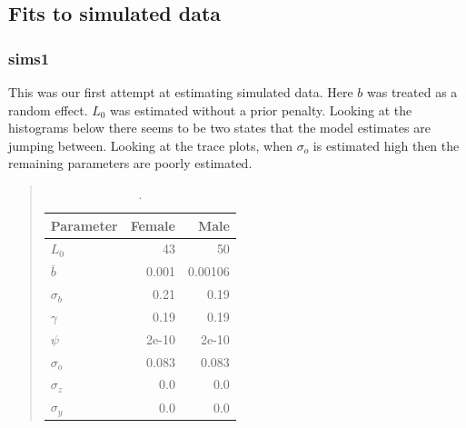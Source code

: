 \documentclass[11pt, a4paper]{article}
\begin{document}
\newpage\clearpage
\subsection{Fits to simulated data}

\subsubsection{sims1}
This was our first attempt at estimating simulated data.  Here $b$ was treated
as a random effect.  $L_0$ was estimated without a prior penalty.  Looking at
the histograms below there seems to be two states that the model estimates are
jumping between.  Looking at the trace plots, when $\sigma_o$ is estimated high
then the remaining parameters are poorly estimated.
\begin{table}[!htbp]
  \begin{quote}
  \caption{\label{tab:} .} \small{
  \begin{center}
  \begin{tabular}{lrr}
  \hline
  Parameter      & Female & Male\\
  \hline
  $L_0$          & 43   & 50\\
  $\overline{b}$ & 0.001 & 0.00106\\
  $\sigma_b$     & 0.21 & 0.19\\
  $\gamma$       & 0.19   & 0.19\\
  $\psi$         & 2e-10 & 2e-10\\
  $\sigma_o$     & 0.083 & 0.083\\
  $\sigma_z$     & 0.0   & 0.0\\
  $\sigma_y$     & 0.0   & 0.0\\
  \hline
  \end{tabular}
  \end{center}
  }
  \end{quote}
\end{table}
\end{document}
